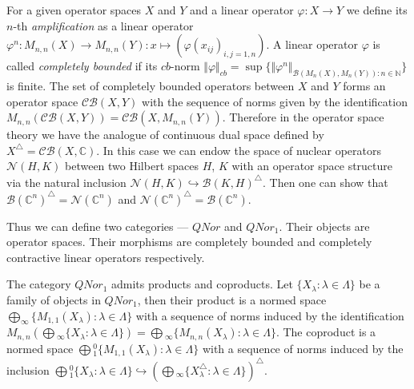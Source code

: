 \documentclass[a0b,landscape]{a0poster}
\begin{document}
\begin{multicols}{4}
For a given operator spaces $X$ and $Y$ and a linear operator $\varphi:X\to Y$
we define its $n$-th \textit{amplification} as a linear operator
$\varphi^n:M_{n,n}(X)\to M_{n,n}(Y):x\mapsto ({\varphi(x_{ij})}_{i,j=1,n})$. A
linear operator $\varphi$ is called \textit{completely bounded} if its $cb$-norm
$\Vert \varphi\Vert_{cb}=\sup \{\Vert
\varphi^n\Vert_{\mathcal{B}(M_n(X),M_n(Y)):n\in\mathbb{N}}\}$ is finite. The set
of completely bounded operators between $X$ and $Y$ forms an operator space
$\mathcal{CB}(X,Y)$ with the sequence of norms given by the identification
$M_{n,n}(\mathcal{CB}(X,Y))=\mathcal{CB}(X,M_{n,n}(Y))$. Therefore in the
operator space theory we have the analogue of continuous dual space defined by
$X^\triangle=\mathcal{CB}(X,\mathbb{C})$. In this case we can endow the space of
nuclear operators $\mathcal{N}(H,K)$ between two Hilbert spaces $H$, $K$ with an
operator space structure via the natural inclusion
$\mathcal{N}(H,K)\hookrightarrow {\mathcal{B}(K,H)}^\triangle$. 
Then one can show
that ${\mathcal{B}(\mathbb{C}^n)}^\triangle=\mathcal{N}(\mathbb{C}^n)$ and
${\mathcal{N}(\mathbb{C}^n)}^\triangle=\mathcal{B}(\mathbb{C}^n)$.

Thus we can define two categories --- $QNor$ and $QNor_1$. Their objects are
operator spaces. Their morphisms are completely bounded and completely
contractive linear operators respectively.

The category $QNor_1$ admits products and coproducts. Let $\{X_ \lambda :
\lambda \in \Lambda \}$ be a family of objects in $QNor_1$, 
then their product is
a normed space $\bigoplus_\infty \{M_{1,1}(X_ \lambda ): \lambda \in \Lambda \}$
with a sequence of norms induced by the identification
$M_{n,n}\left(\bigoplus{}_\infty \{X_ \lambda : \lambda  \in
\Lambda \}\right)=\bigoplus{}_\infty \{M_{n,n}(X_ \lambda ): \lambda \in
\Lambda \}$. The coproduct is a normed space 
$\bigoplus{}_1^0\{M_{1,1}(X_ \lambda): \lambda \in \Lambda \}$ 
with a sequence of norms induced by the inclusion
$\bigoplus{}_1^0\{
    X_\lambda:\lambda\in\Lambda 
 \}\hookrightarrow{
     \left(\bigoplus{}_\infty \{
         X_\lambda^\triangle:\lambda\in\Lambda 
     \}\right)}^\triangle$.


\end{multicols}
\end{document}

